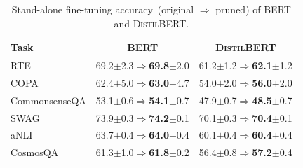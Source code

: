 \begin{table}[t!]
	\centering
	\scriptsize
	\begin{tabular}{l|cc}
		\toprule
		\textbf{Task} & \textsc{BERT} & \textsc{DistilBERT}\\
		\midrule
		RTE & 69.2$\pm${\scriptsize 2.3}$\Rightarrow$\textbf{69.8}$\pm${\scriptsize2.0} &61.2$\pm${\scriptsize 1.2}$\Rightarrow$\textbf{62.1}$\pm${\scriptsize 1.2}\\
		
		COPA & 62.4$\pm${\scriptsize 5.0}$\Rightarrow$\textbf{63.0}$\pm${\scriptsize 4.7}    & 54.0$\pm${\scriptsize 2.0}$\Rightarrow$\textbf{56.0}$\pm${\scriptsize 2.0}   \\
		
		CommonsenseQA & 53.1$\pm${\scriptsize 0.6}$\Rightarrow$\textbf{54.1}$\pm${\scriptsize 0.7}   &47.9$\pm${\scriptsize 0.7}$\Rightarrow$\textbf{48.5}$\pm${\scriptsize 0.7}\\
		
		SWAG & 73.9$\pm${\scriptsize 0.3}$\Rightarrow$\textbf{74.2}$\pm${\scriptsize 0.1} &70.1$\pm${\scriptsize 0.3}$\Rightarrow$\textbf{70.4}$\pm${\scriptsize 0.1}  \\
		aNLI &63.7$\pm${\scriptsize 0.4}$\Rightarrow$\textbf{64.0}$\pm${\scriptsize 0.4}  &60.1$\pm${\scriptsize 0.4}$\Rightarrow$\textbf{60.4}$\pm${\scriptsize 0.4}\\
		CosmosQA &61.3$\pm${\scriptsize 1.0}$\Rightarrow$\textbf{61.8}$\pm${\scriptsize 0.2} &56.4$\pm${\scriptsize 0.8}$\Rightarrow$\textbf{57.2}$\pm${\scriptsize 0.4} \\
		\bottomrule
	\end{tabular}
	\caption{Stand-alone fine-tuning accuracy~(original $\Rightarrow$ pruned) of \textsc{BERT} and \textsc{DistilBERT}.\quad}
	\label{table:finetuning}
\end{table}

